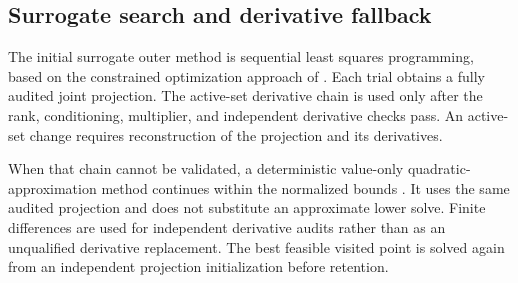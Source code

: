 \subsection{Surrogate search and derivative fallback}

The initial surrogate outer method is sequential least squares programming, based on the constrained optimization approach of \citet{Kraft1988}. Each trial obtains a fully audited joint projection. The active-set derivative chain is used only after the rank, conditioning, multiplier, and independent derivative checks pass. An active-set change requires reconstruction of the projection and its derivatives.

When that chain cannot be validated, a deterministic value-only quadratic-approximation method continues within the normalized bounds \citep{Ragonneau2022}. It uses the same audited projection and does not substitute an approximate lower solve. Finite differences are used for independent derivative audits rather than as an unqualified derivative replacement. The best feasible visited point is solved again from an independent projection initialization before retention.

